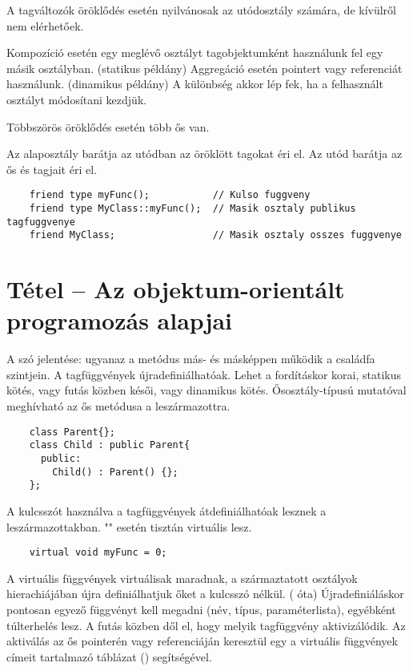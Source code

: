 \documentclass[main.tex]{subfiles}
\begin{document}
  A  tagváltozók öröklődés esetén
  nyilvánosak az utódosztály számára,
  de kívülről nem elérhetőek.


  Kompozíció esetén egy meglévő osztályt
  tagobjektumként használunk
  fel egy másik osztályban. (statikus példány)
  Aggregáció esetén pointert vagy referenciát
  használunk. (dinamikus példány)
  A különbség akkor lép fek, ha a felhasznált
  osztályt módosítani kezdjük.


  Többszörös öröklődés esetén több ős van.


  Az alaposztály barátja az utódban az öröklött tagokat éri el.
  Az utód barátja az ős  és  tagjait éri el.
  \begin{lstlisting}
    friend type myFunc();           // Kulso fuggveny
    friend type MyClass::myFunc();  // Masik osztaly publikus tagfuggvenye
    friend MyClass;                 // Masik osztaly osszes fuggvenye
  \end{lstlisting}



  \section{Tétel – Az objektum-orientált programozás alapjai} %

  A szó jelentése: ugyanaz a metódus más-
  és másképpen működik a családfa szintjein.
  A tagfüggvények újradefiniálhatóak.
  Lehet a fordításkor korai, statikus kötés,
  vagy futás közben késői, vagy dinamikus kötés.
  Ősosztály-típusú mutatóval meghívható az ős metódusa a leszármazottra.
  \begin{lstlisting}
    class Parent{};
    class Child : public Parent{
      public:
        Child() : Parent() {};
    };
  \end{lstlisting}

  A  kulcsszót használva a tagfüggvények
  átdefiniálhatóak lesznek a leszármazottakban.
  "" esetén tisztán virtuális lesz.
  \begin{lstlisting}
    virtual void myFunc = 0;
  \end{lstlisting}
  A virtuális függvények virtuálisak maradnak,
  a származtatott osztályok hierachiájában újra definiálhatjuk
  őket a  kulcsszó nélkül. ( óta)
  Újradefiniáláskor pontosan egyező függvényt kell megadni
  (név, típus, paraméterlista), egyébként túlterhelés lesz.
  A futás közben dől el, hogy melyik tagfüggvény aktivizálódik.
  Az aktiválás az ős pointerén vagy referenciáján keresztül
  egy a virtuális függvények címeit tartalmazó
  táblázat () segítségével.
\end{document}
